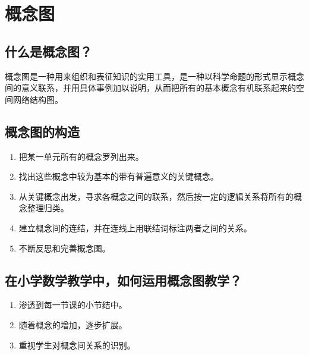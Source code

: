 \clearpage

\section{概念图}

\subsection{什么是概念图？}  
概念图是一种用来组织和表征知识的实用工具，是一种以科学命题的形式显示概念间的意义联系，并用具体事例加以说明，从而把所有的基本概念有机联系起来的空间网络结构图。

\subsection{概念图的构造}
\begin{enumerate}
    \item 把某一单元所有的概念罗列出来。
    \item 找出这些概念中较为基本的带有普遍意义的关键概念。
    \item 从关键概念出发，寻求各概念之间的联系，然后按一定的逻辑关系将所有的概念整理归类。
    \item 建立概念间的连结，并在连线上用联结词标注两者之间的关系。
    \item 不断反思和完善概念图。
\end{enumerate}

\subsection{在小学数学教学中，如何运用概念图教学？}
\begin{enumerate}
    \item 渗透到每一节课的小节结中。
    \item 随着概念的增加，逐步扩展。
    \item 重视学生对概念间关系的识别。
\end{enumerate}
